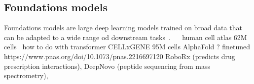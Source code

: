 \documentclass[../main.tex]{subfiles}
\begin{document}
	\subsection{Foundations models}
		Foundations models are large deep learning models trained on broad data that can be adapted to a wide range od downstream tasks~\cite{bommasani2022opportunitiesrisksfoundationmodels}.
		~\cite{Cui2024}~\cite{Moor2023}
		human cell atlas 62M cells~\cite{Regev2017} how to do with transformer
		CELLxGENE 95M cells %
		AlphaFold ? finetuned https://www.pnas.org/doi/10.1073/pnas.2216697120
		RoboRx (predicts drug prescription interactions), DeepNovo (peptide sequencing from mass spectrometry),
\end{document}
